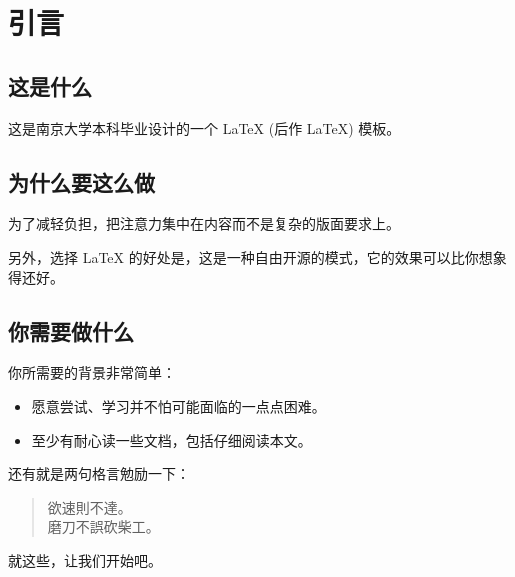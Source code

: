 \chapter{引言}

\section{这是什么}
这是南京大学本科毕业设计的一个 \LaTeX{} (后作 LaTeX) 模板。

\section{为什么要这么做}
为了减轻负担，把注意力集中在内容而不是复杂的版面要求上。

另外，选择 LaTeX 的好处是，这是一种自由开源的模式，它的效果可以比你想象得还好。

\section{你需要做什么}
你所需要的背景非常简单：
\begin{itemize}
	\item 愿意尝试、学习并不怕可能面临的一点点困难。
	\item 至少有耐心读一些文档，包括仔细阅读本文。
\end{itemize}

还有就是两句格言勉励一下：
\begin{verse}
	\kaishu
	欲速則不達。\\
	磨刀不誤砍柴工。
\end{verse}

就这些，让我们开始吧。
